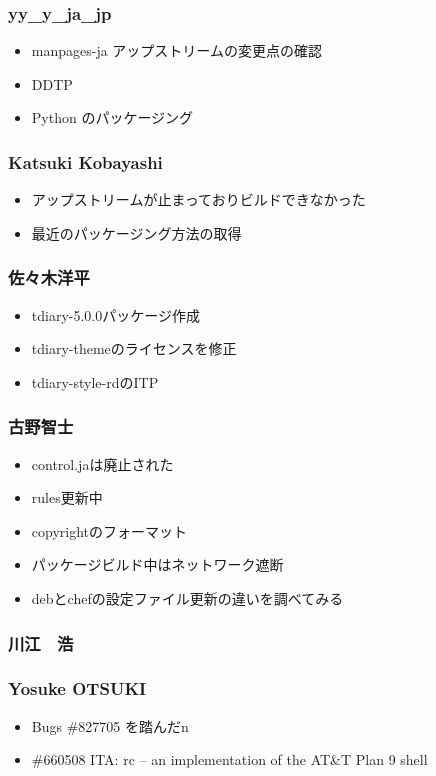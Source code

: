 \documentclass[cjk,dvipdfmx,10pt,compress,%
hyperref={bookmarks=true,bookmarksnumbered=true,bookmarksopen=false,%
colorlinks=false,%
pdftitle={第 111 回 関西 Debian 勉強会},%
pdfauthor={倉敷・のがた・佐々木・かわだ},%
pdfsubject={資料},%
}]{beamer}
\begin{document}
\begin{frame}
  \frametitle{ yy\_y\_ja\_jp }
  \begin{itemize}
  \item manpages-ja アップストリームの変更点の確認
  \item DDTP
  \item Python のパッケージング
  \end{itemize}
\end{frame}

\begin{frame}
  \frametitle{ Katsuki Kobayashi }
  \begin{itemize}
  \item アップストリームが止まっておりビルドできなかった
  \item 最近のパッケージング方法の取得
  \end{itemize}
\end{frame}

\begin{frame}
  \frametitle{ 佐々木洋平 }
  \begin{itemize}
  \item tdiary-5.0.0パッケージ作成
  \item tdiary-themeのライセンスを修正
  \item tdiary-style-rdのITP
  \end{itemize}
\end{frame}

\begin{frame}
  \frametitle{ 古野智士 }
  \begin{itemize}
  \item control.jaは廃止された
  \item rules更新中
  \item copyrightのフォーマット
  \item パッケージビルド中はネットワーク遮断
  \item debとchefの設定ファイル更新の違いを調べてみる
  \end{itemize}
\end{frame}

\begin{frame}
  \frametitle{ 川江　浩 }
\end{frame}

\begin{frame}
  \frametitle{ Yosuke OTSUKI }
  \begin{itemize}
  \item Bugs \#827705 を踏んだn
  \item \#660508 ITA: rc -- an implementation of the AT\&T Plan 9 shell
  \end{itemize}
\end{frame}
\end{document}
